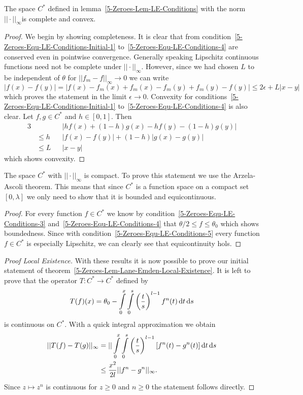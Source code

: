 \begin{lemma}
	The space $C^*$ defined in lemma~\ref{5-Zeroes-Lem-LE-Conditions} with the norm $||\cdot||_\infty$is complete and convex.
\end{lemma}
\begin{proof}
	We begin by showing completeness.
	It is clear that from condition~\eqref{5-Zeroes-Equ-LE-Conditions-Initial-1} to~\eqref{5-Zeroes-Equ-LE-Conditions-4} are conserved even in pointwise convergence.
	Generally speaking Lipschitz continuous functions need not be complete under $||\cdot||_\infty$.
	However, since we had chosen $L$ to be independent of $\theta$ for $||f_m-f||_\infty\rightarrow0$ we can write
	\[
		|f(x)-f(y)|=|f(x)-f_m(x)+f_m(x)-f_m(y)+f_m(y)-f(y)|\leq 2\epsilon+L|x-y|
	\]
	which proves the statement in the limit $\epsilon\rightarrow0$.
	Convexity for conditions~\eqref{5-Zeroes-Equ-LE-Conditions-Initial-1} to~\eqref{5-Zeroes-Equ-LE-Conditions-4} is also clear.
	Let $f,g\in C^*$ and $h\in[0,1]$.
	Then
	\begin{alignat}{3}
		&&&|hf(x)+(1-h)g(x)-hf(y)-(1-h)g(y)|\\
		&\leq h&&|f(x)-f(y)|+ (1-h)|g(x)-g(y)|\\
		&\leq L&&|x-y|
	\end{alignat}
	which shows convexity.
\end{proof}\noindent
\begin{lemma}
	The space $C^*$ with $||\cdot||_\infty$ is compact.
	To prove this statement we use the Arzela-Ascoli theorem.
	This means that since $C^*$ is a function space on a compact set $[0,\lambda]$ we only need to show that it is bounded and equicontinuous.
\end{lemma}
\begin{proof}
	For every function $f\in C^*$ we know by condition~\eqref{5-Zeroes-Equ-LE-Conditions-3} and~\eqref{5-Zeroes-Equ-LE-Conditions-4} that $\theta/2\leq f\leq\theta_0$ which shows boundedness.
	Since with condition~\eqref{5-Zeroes-Equ-LE-Conditions-5} every function $f\in C^*$ is especially Lipschitz, we can clearly see that equicontinuity hols.
\end{proof}
\begin{proof}[Proof  Local Existence]
	With these results it is now possible to prove our initial statement of theorem~\ref{5-Zeroes-Lem-Lane-Emden-Local-Existence}.
	It is left to prove that the operator $T:C^*\rightarrow C^*$ defined by
	\begin{equation}
		T(f)(x) = \theta_0 - \int\limits_0^x\int\limits_0^s \left(\frac{t}{s}\right)^{l-1}f^n(t)\mathop{}\!\mathrm{d} t\mathop{}\!\mathrm{d} s
		\label{eq:5-Zeroes-LE-Definition-Operator-On-C-Star}
	\end{equation}
	is continuous on $C^*$.
	With a quick integral approximation we obtain
	\begin{align}
		||T(f)-T(g)||_{\infty} &= ||\int\limits_0^x\int\limits_0^s \left(\frac{t}{s}\right)^{l-1}\left[f^n(t)-g^n(t)\right]\mathop{}\!\mathrm{d} t\mathop{}\!\mathrm{d} s\\
		&\leq \frac{x^2}{2l}||f^n-g^n||_{\infty}.
	\end{align}
	Since $z\mapsto z^n$ is continuous for $z\geq0$ and $n\geq0$ the statement follows directly.
\end{proof}\noindent
